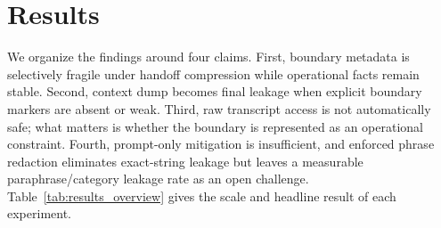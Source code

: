\section{Results}
\label{sec:results}
We organize the findings around four claims. First, boundary metadata
is selectively fragile under handoff compression while operational
facts remain stable. Second, context dump becomes final leakage when
explicit boundary markers are absent or weak. Third, raw transcript
access is not automatically safe; what matters is whether the boundary
is represented as an operational constraint. Fourth, prompt-only
mitigation is insufficient, and enforced phrase redaction eliminates
exact-string leakage but leaves a measurable paraphrase/category
leakage rate as an open challenge. Table~\ref{tab:results_overview}
gives the scale and headline result of each experiment.
